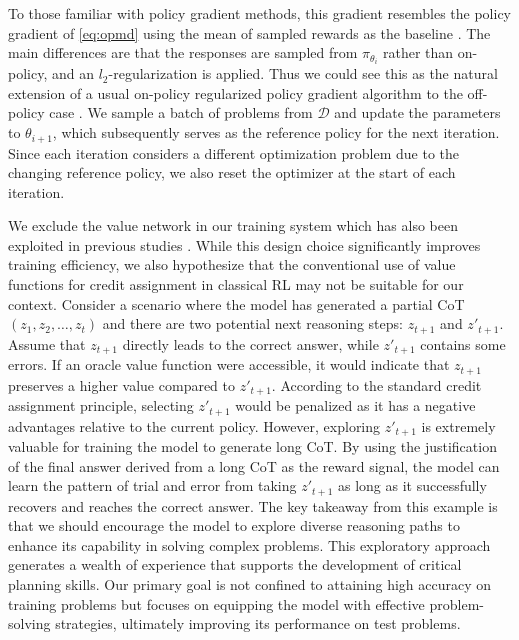\documentclass{article}
\newcommand{\citep}[1]{\parencite{#1}}
\begin{document}
To those familiar with policy gradient methods, this gradient resembles the policy gradient of \eqref{eq:opmd} using the mean of sampled rewards as the baseline \citep{kool2019buy,ahmadian2024back}. 
The main differences are  that the responses are sampled from $\pi_{\theta_i}$ rather than on-policy, and an $l_2$-regularization is applied. 
Thus we could see this as the natural extension of a usual on-policy regularized policy gradient algorithm to the off-policy case \citep{nachum2017bridging}. 
We sample a batch of problems from $\mathcal{D}$ and update the parameters to $\theta_{i+1}$, which subsequently serves as the reference policy for the next iteration. Since each iteration considers a different optimization problem due to the changing reference policy, we also reset the optimizer at the start of each iteration. 

We exclude the value network in our training system which has also been exploited in previous studies \citep{ahmadian2024back}. 
While this design choice significantly improves training efficiency, we also hypothesize that the conventional use of value functions for credit assignment in classical RL may not be suitable for our context. 
Consider a scenario where the model has generated a partial CoT $(z_1, z_2, \dots, z_t)$ and there are two potential next reasoning steps: $z_{t+1}$ and $z'_{t+1}$. 
Assume that $z_{t+1}$ directly leads to the correct answer, while $z'_{t+1}$ contains some errors. 
 If an oracle value function were accessible, it would indicate that $z_{t+1}$ preserves a higher value compared to $z'_{t+1}$. 
 According to the standard credit assignment principle, selecting $z'_{t+1}$ would be penalized as it has a negative advantages relative to the current policy. 
However, exploring $z'_{t+1}$ is extremely valuable for training the model to generate long CoT. 
By using the justification of the final answer derived from a long CoT as the reward signal, the model can learn the pattern of trial and error from taking $z'_{t+1}$ as long as it successfully recovers and reaches the correct answer.  
The key takeaway from this example is that we should encourage the model to explore diverse reasoning paths to enhance its capability in solving complex problems. This exploratory approach generates a wealth of experience that supports the development of critical planning skills. Our primary goal is not confined to attaining high accuracy on training problems but focuses on equipping the model with effective problem-solving strategies, ultimately improving its performance on test problems.
\end{document}
